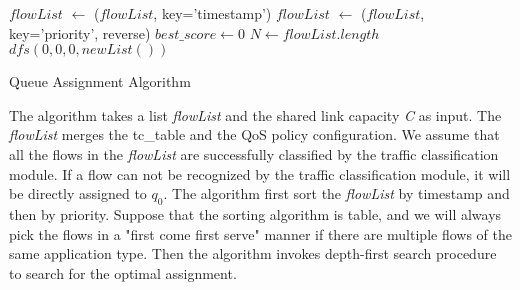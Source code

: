 \begin{algorithm}[htp]
  \SetAlgoLined
  \scriptsize
  
  $flowList$ $\leftarrow$ \Sort($flowList$, key='timestamp')\;
  $flowList$ $\leftarrow$ \Sort($flowList$, key='priority', reverse)\;
  $best\_score \leftarrow 0$ \;
  $N \leftarrow flowList.length$ \;
  $dfs(0, 0, 0, newList())$ \;
  \setcounter{AlgoLine}{0}
  \caption{Queue Assignment Algorithm}
  \label{alg:queueAssignAlgo}
\end{algorithm} 


The algorithm takes a list \emph{flowList} and the shared link capacity \emph{C} as input. The \emph{flowList} merges the tc\_table and the
QoS policy configuration. We assume that all the flows in the \emph{flowList} are successfully classified by the traffic classification module.
If a flow can not be recognized by the traffic classification module, it will be directly assigned to $q_0$. The algorithm first sort the
\emph{flowList} by timestamp and then by priority. Suppose that the sorting algorithm is table, and we will always pick the flows in a
"first come first serve" manner if there are multiple flows of the same application type. Then the algorithm invokes depth-first search procedure
to search for the optimal assignment.
